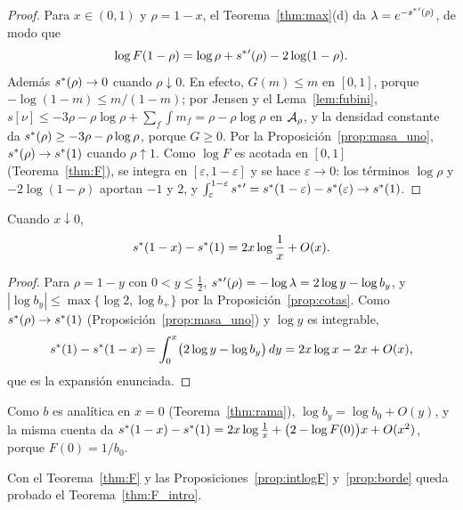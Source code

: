 \begin{proof}
Para $x\in(0,1)$ y $\rho=1-x$, el Teorema~\ref{thm:max}(d) da $\lambda=e^{-s^{*}{}'(\rho)}$, de modo que
\[
 \log F(1-\rho)=\log\rho+s^{*}{}'(\rho)-2\log(1-\rho).
\]
Además $s^{*}(\rho)\to0$ cuando $\rho\downarrow0$. En efecto, $G(m)\le m$ en $[0,1]$, porque
$-\log(1-m)\le m/(1-m)$; por Jensen y el Lema~\ref{lem:fubini},
$s[\nu]\le-3\rho-\rho\log\rho+\sum_f\int m_f=\rho-\rho\log\rho$ en ${\mathcal{A}}_\rho$, y la densidad constante da
$s^{*}(\rho)\ge-3\rho-\rho\log\rho$, porque $G\ge0$. Por la Proposición~\ref{prop:masa_uno},
$s^{*}(\rho)\to s^{*}(1)$ cuando $\rho\uparrow1$. Como $\log F$ es acotada en $[0,1]$
(Teorema~\ref{thm:F}), se integra en $[\varepsilon,1-\varepsilon]$ y se hace $\varepsilon\to0$: los
términos $\log\rho$ y $-2\log(1-\rho)$ aportan $-1$ y $2$, y
$\int_\varepsilon^{1-\varepsilon}s^{*}{}'=s^{*}(1-\varepsilon)-s^{*}(\varepsilon)\to s^{*}(1)$.
\end{proof}

\begin{proposicion}\label{prop:borde}
Cuando $x\downarrow0$,
\[
 s^{*}(1-x)-s^{*}(1)=2x\log\frac1x+O(x).
\]
\end{proposicion}

\begin{proof}
Para $\rho=1-y$ con $0<y\le\frac12$, $s^{*}{}'(\rho)=-\log\lambda=2\log y-\log b_y$, y
$|\log b_y|\le\max\{\log2,\log b_+\}$ por la Proposición~\ref{prop:cotas}. Como
$s^{*}(\rho)\to s^{*}(1)$ (Proposición~\ref{prop:masa_uno}) y $\log y$ es integrable,
\[
 s^{*}(1)-s^{*}(1-x)=\int_0^x\bigl(2\log y-\log b_y\bigr)\,dy=2x\log x-2x+O(x),
\]
que es la expansión enunciada.
\end{proof}

\begin{observacion}\label{obs:borde_fino}
Como $b$ es analítica en $x=0$ (Teorema~\ref{thm:rama}), $\log b_y=\log b_0+O(y)$, y la misma cuenta da
$s^{*}(1-x)-s^{*}(1)=2x\log\frac1x+\bigl(2-\log F(0)\bigr)x+O(x^2)$, porque $F(0)=1/b_0$.
\end{observacion}

Con el Teorema~\ref{thm:F} y las Proposiciones~\ref{prop:intlogF} y~\ref{prop:borde} queda probado el
Teorema~\ref{thm:F_intro}.
